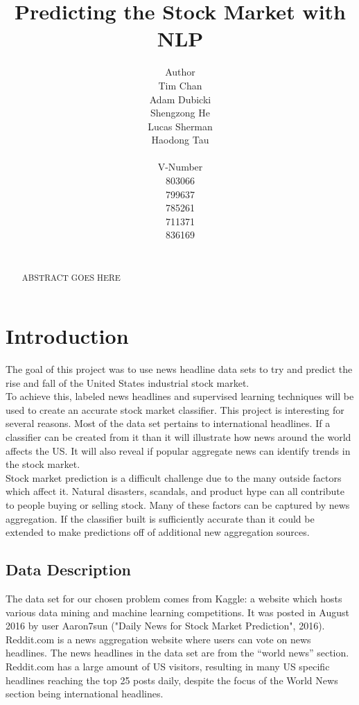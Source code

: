 \documentclass[11pt,a4paper]{article}
\title{Predicting the Stock Market with NLP}
\author{Author \\
  Tim Chan \\
  Adam Dubicki \\
  Shengzong He \\
  Lucas Sherman\\
  Haodong Tau\\
  {\tt} \\\And
  V-Number \\
  803066 \\
  799637 \\
  785261 \\
  711371\\
  836169\\
  {\tt} \\}
\date{}
\begin{document}
\maketitle
\begin{abstract}
    ABSTRACT GOES HERE
\end{abstract}


\section{Introduction}
The goal of this project was to use news headline data sets to try and predict the rise and fall of the United States industrial stock market.\\


To achieve this, labeled news headlines and supervised learning techniques will be used to create an accurate stock market classifier. This project is interesting for several reasons. Most of the data set pertains to international headlines. If a classifier can be created from it than it will illustrate how news around the world affects the US. It will also reveal if popular aggregate news can identify trends in the stock market.\\
  

Stock market prediction is a difficult challenge due to the many outside factors which affect it. Natural disasters, scandals, and product hype can all contribute to people buying or selling stock. Many of these factors can be captured by news aggregation. If the classifier built is sufficiently accurate than it could be extended to make predictions off of additional new aggregation sources.\\


\subsection{Data Description}
The data set for our chosen problem comes from Kaggle: a website which hosts various data mining and machine learning competitions. It was posted in August 2016 by user Aaron7sun ("Daily News for Stock Market Prediction", 2016). Reddit.com is a news aggregation website where users can vote on news headlines. The news headlines in the data set are from the “world news” section. Reddit.com has a large amount of US visitors, resulting in many US specific headlines reaching the top 25 posts daily, despite the focus of the World News section being international headlines.\\
\end{document}

